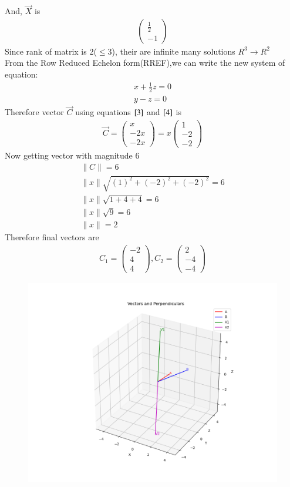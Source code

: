 \documentclass[journal]{IEEEtran}
\begin{document}
And, $\vec{X}$ is
\begin{align}
    \begin{pmatrix}\frac{1}{2}\\-1\end{pmatrix}
\end{align}
Since rank of matrix is 2($\leq 3$), their are infinite many solutions $R^3\rightarrow R^2$\\
From the Row Reduced Echelon form(RREF),we can write the new system of equation:
\begin{align}
    x+\frac{1}{2}z=0 \label{3} \\
    y-z=0 \label{4}
\end{align}
Therefore vector $\vec{C}$ using equations $\eqref{3}$ and $\eqref{4}$ is
\begin{align}
    \vec{C}=\begin{pmatrix}x\\-2x\\-2x\end{pmatrix}=x\begin{pmatrix}1\\-2\\-2\end{pmatrix}
\end{align}
Now getting vector with magnitude 6
\begin{align}
    \lVert C\rVert =6\\
    \lVert x\rVert \sqrt{(1)^2+(-2)^2+(-2)^2}=6\\
    \lVert x\rVert \sqrt{1+4+4}=6\\
    \lVert x\rVert \sqrt{9}=6\\
    \lVert x\rVert =2
\end{align}
Therefore final vectors are
\begin{align}
    C_1=\begin{pmatrix} -2\\4\\4 \end{pmatrix},
    C_2=\begin{pmatrix} 2\\-4\\-4 \end{pmatrix}
\end{align}
\begin{figure}[H]
    \centering
    \includegraphics[width=\columnwidth]{figs/vector_plot.png}
    \caption{}
    \label{fig:placeholder}
\end{figure}
\end{document}
